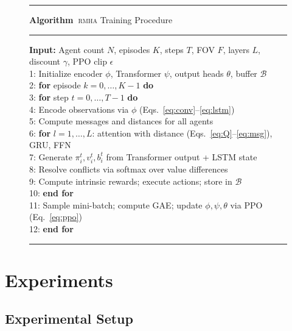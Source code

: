 \documentclass[sigconf]{acmart}
\newcounter{algctr}
\renewcommand{\thealgctr}{\arabic{algctr}}
\newcommand{\rmha}{\textsc{rmha}}
\begin{document}
\begin{figure}[t]
\hrule\smallskip
\noindent\textbf{Algorithm~\thealgctr}\quad \rmha{} Training Procedure
\label{alg:rmha}\smallskip\hrule\smallskip
{\small
\noindent\textbf{Input:} Agent count $N$, episodes $K$, steps $T$,
FOV $F$, layers $L$, discount $\gamma$, PPO clip $\epsilon$\\[2pt]
1: Initialize encoder $\phi$, Transformer $\psi$, output heads $\theta$, buffer $\mathcal{B}$\\
2: \textbf{for} episode $k = 0, \ldots, K\!-\!1$ \textbf{do}\\
3: \quad\textbf{for} step $t = 0, \ldots, T\!-\!1$ \textbf{do}\\
4: \quad\quad Encode observations via $\phi$ (Eqs.~\ref{eq:conv}--\ref{eq:lstm})\\
5: \quad\quad Compute messages and distances for all agents\\
6: \quad\quad \textbf{for} $l = 1, \ldots, L$: attention with distance (Eqs.~\ref{eq:Q}--\ref{eq:msg}), GRU, FFN\\
7: \quad\quad Generate $\pi_i^t, v_i^t, b_i^t$ from Transformer output + LSTM state\\
8: \quad\quad Resolve conflicts via softmax over value differences\\
9: \quad\quad Compute intrinsic rewards; execute actions; store in $\mathcal{B}$\\
10: \quad\textbf{end for}\\
11: \quad Sample mini-batch; compute GAE; update $\phi,\psi,\theta$ via PPO (Eq.~\ref{eq:ppo})\\
12: \textbf{end for}
}\smallskip\hrule
\end{figure}

\section{Experiments}

\subsection{Experimental Setup}
\end{document}
